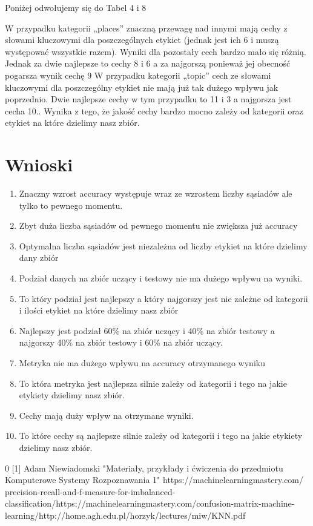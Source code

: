 \documentclass{classrep}
\begin{document}
{Poniżej odwołujemy się do Tabel 4 i 8

W przypadku kategorii „places” znaczną przewagę nad innymi mają cechy z słowami kluczowymi dla poszczególnych etykiet (jednak jest ich 6 i muszą występować wszystkie razem). Wyniki dla pozostały cech bardzo mało się różnią. Jednak za dwie najlepsze to cechy 8 i 6 a za najgorszą ponieważ jej obecność pogarsza wynik cechę 9 W przypadku kategorii „topic” cech ze słowami kluczowymi dla poszczególny etykiet nie mają już tak dużego wpływu jak poprzednio. Dwie najlepsze cechy w tym przypadku to 11 i 3 a najgorsza jest cecha 10.. Wynika z tego, że jakość cechy bardzo mocno zależy od kategorii oraz etykiet na które dzielimy nasz zbiór. 
}
\section{Wnioski}
{
\begin{enumerate}
\item  Znaczny wzrost accuracy występuje wraz ze wzrostem liczby sąsiadów ale tylko to pewnego momentu.
\item  Zbyt duża liczba sąsiadów od pewnego momentu nie zwiększa już accuracy
\item  Optymalna liczba sąsiadów jest niezależna od liczby etykiet na które dzielimy dany zbiór
\item  Podział danych na zbiór uczący i testowy nie ma dużego wpływu na wyniki. 
\item  To który podział jest najlepszy a który najgorszy jest nie zależne od kategorii i ilości etykiet na które dzielimy nasz zbiór
\item  Najlepszy jest podział 60\% na zbiór uczący i 40\% na zbiór testowy a najgorszy 40\% na zbiór testowy i 60\% na zbiór uczący.
\item  Metryka nie ma dużego wpływu na accuracy otrzymanego wyniku
\item  To która metryka jest najlepsza silnie zależy od kategorii i tego na jakie etykiety dzielimy nasz zbiór.
\item  Cechy mają duży wpływ na otrzymane wyniki.
\item  To które cechy są najlepsze silnie zależy od kategorii i tego na jakie etykiety dzielimy nasz zbiór. 

\end{enumerate}
}


\begin{thebibliography}{0}
[1] Adam Niewiadomski "Materiały, przykłady i ćwiczenia do przedmiotu Komputerowe Systemy Rozpoznawania 1" \newline
[2] https://machinelearningmastery.com/\newline
precision-recall-and-f-measure-for-imbalanced-classification/\newline
[3] https://machinelearningmastery.com/confusion-matrix-machine-learning/\newline
[4] http://home.agh.edu.pl/horzyk/lectures/miw/KNN.pdf\newline
\end{thebibliography}
\end{document}
